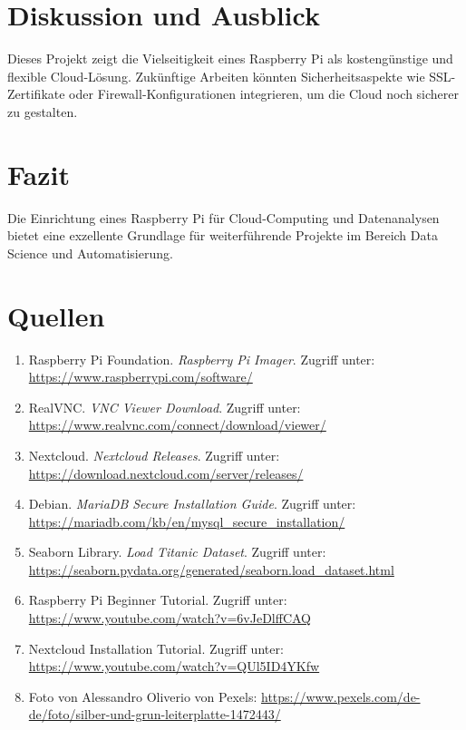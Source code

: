 \documentclass[a4paper,12pt]{article}
\begin{document}
\section{Diskussion und Ausblick}
Dieses Projekt zeigt die Vielseitigkeit eines Raspberry Pi als kostengünstige und flexible Cloud-Lösung. Zukünftige Arbeiten könnten Sicherheitsaspekte wie SSL-Zertifikate oder Firewall-Konfigurationen integrieren, um die Cloud noch sicherer zu gestalten.

\section{Fazit}
Die Einrichtung eines Raspberry Pi für Cloud-Computing und Datenanalysen bietet eine exzellente Grundlage für weiterführende Projekte im Bereich Data Science und Automatisierung.

\section{Quellen}
\begin{enumerate}
    \item Raspberry Pi Foundation. \textit{Raspberry Pi Imager}. Zugriff unter: \url{https://www.raspberrypi.com/software/}
    \item RealVNC. \textit{VNC Viewer Download}. Zugriff unter: \url{https://www.realvnc.com/connect/download/viewer/}
    \item Nextcloud. \textit{Nextcloud Releases}. Zugriff unter: \url{https://download.nextcloud.com/server/releases/}
    \item Debian. \textit{MariaDB Secure Installation Guide}. Zugriff unter: \url{https://mariadb.com/kb/en/mysql_secure_installation/}
    \item Seaborn Library. \textit{Load Titanic Dataset}. Zugriff unter: \url{https://seaborn.pydata.org/generated/seaborn.load_dataset.html}
    \item Raspberry Pi Beginner Tutorial. Zugriff unter: \url{https://www.youtube.com/watch?v=6vJeDlffCAQ}
    \item Nextcloud Installation Tutorial. Zugriff unter: \url{https://www.youtube.com/watch?v=QUl5ID4YKfw}
    \item Foto von Alessandro Oliverio von Pexels: \url{https://www.pexels.com/de-de/foto/silber-und-grun-leiterplatte-1472443/}
\end{enumerate}
\end{document}
